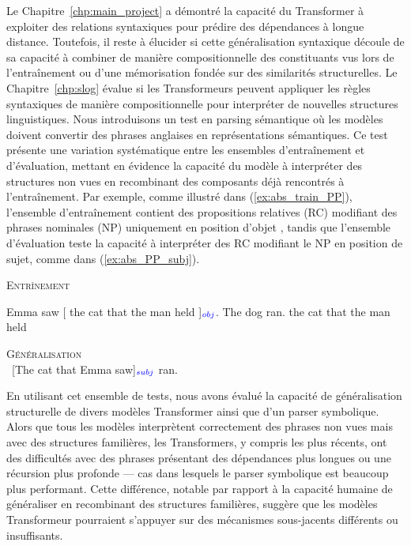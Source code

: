 Le Chapitre~\ref{chp:main_project} a démontré la capacité du Transformer à exploiter des relations syntaxiques pour prédire des dépendances à longue distance. Toutefois, il reste à élucider si cette généralisation syntaxique découle de sa capacité à combiner de manière compositionnelle des constituants vus lors de l'entraînement ou d'une mémorisation fondée sur des similarités structurelles. Le Chapitre~\ref{chp:slog} évalue si les Transformeurs peuvent appliquer les règles syntaxiques de manière compositionnelle pour interpréter de nouvelles structures linguistiques. Nous introduisons un test en parsing sémantique où les modèles doivent convertir des phrases anglaises en représentations sémantiques. Ce test présente une variation systématique entre les ensembles d'entraînement et d'évaluation, mettant en évidence la capacité du modèle à interpréter des structures non vues en recombinant des composants déjà rencontrés à l'entraînement. Par exemple, comme illustré dans (\ref{ex:abs_train_PP}), l'ensemble d’entraînement contient des propositions relatives (RC) modifiant des phrases nominales (NP) uniquement en position d'objet , tandis que l'ensemble d'évaluation teste la capacité à interpréter des RC modifiant le NP en position de sujet, comme dans (\ref{ex:abs_PP_subj}).
\vspace{-0.3\baselineskip}
\begin{exe}
    \ex \label{ex:abs_train_PP} \textsc{Entrînement} 
    \vspace{-0.3\baselineskip}
    \begin{xlist}
    \ex \label{ex:abs_train_PP_dobj} Emma saw [ the cat that the man held ]$_{\textcolor{blue}{obj}}$. 
    \vspace{-0.3\baselineskip}
    \ex The dog ran. 
    \vspace{-0.3\baselineskip}
    \ex \label{ex:abs_standalone_PP} the cat that the man held 
    \end{xlist}
    \vspace{-0.3\baselineskip}
\ex \label{ex:abs_PP_subj} \textsc{Généralisation}
 \\
 \vspace{-0.3\baselineskip}
\ [The cat that Emma saw]$_{\textcolor{blue}{subj}}$ ran. 
\end{exe}
\vspace{-0.5\baselineskip}
En utilisant cet ensemble de tests, nous avons évalué la capacité de généralisation structurelle de divers modèles Transformer ainsi que d'un parser symbolique. Alors que tous les modèles interprètent correctement des phrases non vues mais avec des structures familières, les Transformers, y compris les plus récents, ont des difficultés avec des phrases présentant des dépendances plus longues ou une récursion plus profonde --- cas dans lesquels le parser symbolique est beaucoup plus performant. Cette différence, notable par rapport à la capacité humaine de généraliser en recombinant des structures familières, suggère que les modèles Transformeur pourraient s'appuyer sur des mécanismes sous-jacents différents ou insuffisants.

